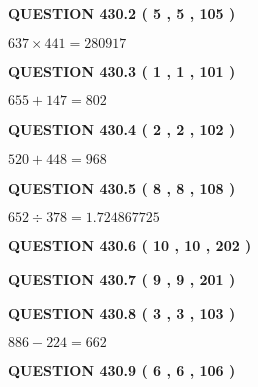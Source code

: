 \documentclass{ctexart}
\begin{document}
{\textbf{\Large{QUESTION
430.2 
 ( 5 , 5 , 105 )
}}}
  
  
 
 

$ %
637 \times  %
441=   %
280917$
 
 
  
\vspace{0.2in}
  
{\textbf{\Large{QUESTION
430.3 
 ( 1 , 1 , 101 )
}}}
  
  
 
 

$ %
655 +  %
147=   %
802$
 
 
  
\vspace{0.2in}
  
{\textbf{\Large{QUESTION
430.4 
 ( 2 , 2 , 102 )
}}}
  
  
 
 

$ %
520 +  %
448=   %
968$
 
 
  
\vspace{0.2in}
  
{\textbf{\Large{QUESTION
430.5 
 ( 8 , 8 , 108 )
}}}
  
  
 
 

$ %
652 \div  %
378=   %
1.724867725$
 
 
  
\vspace{0.2in}
  
{\textbf{\Large{QUESTION
430.6 
 ( 10 , 10 , 202 )
}}}
  
  
  
\vspace{0.2in}
  
{\textbf{\Large{QUESTION
430.7 
 ( 9 , 9 , 201 )
}}}
  
  
  
\vspace{0.2in}
  
{\textbf{\Large{QUESTION
430.8 
 ( 3 , 3 , 103 )
}}}
  
  
 
 

$ %
886 -  %
224=   %
662$
 
 
  
\vspace{0.2in}
  
{\textbf{\Large{QUESTION
430.9 
 ( 6 , 6 , 106 )
}}}
  
  
 
\end{document}
